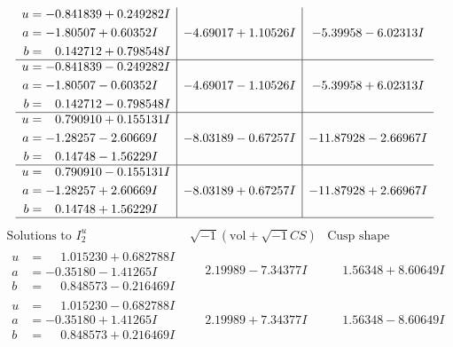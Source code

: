 \documentclass[1p]{elsarticle_modified}
\theoremstyle{definition}
\newcommand{\I}{\sqrt{-1}}
\begin{document}
$$\begin{array}{c|c|c}
\begin{aligned}
u &= -0.841839 + 0.249282 I \\
a &= -1.80507 + 0.60352 I \\
b &= \phantom{-}0.142712 + 0.798548 I\end{aligned}
 & -4.69017 + 1.10526 I & -5.39958 - 6.02313 I \\ \hline\begin{aligned}
u &= -0.841839 - 0.249282 I \\
a &= -1.80507 - 0.60352 I \\
b &= \phantom{-}0.142712 - 0.798548 I\end{aligned}
 & -4.69017 - 1.10526 I & -5.39958 + 6.02313 I \\ \hline\begin{aligned}
u &= \phantom{-}0.790910 + 0.155131 I \\
a &= -1.28257 - 2.60669 I \\
b &= \phantom{-}0.14748 - 1.56229 I\end{aligned}
 & -8.03189 - 0.67257 I & -11.87928 - 2.66967 I \\ \hline\begin{aligned}
u &= \phantom{-}0.790910 - 0.155131 I \\
a &= -1.28257 + 2.60669 I \\
b &= \phantom{-}0.14748 + 1.56229 I\end{aligned}
 & -8.03189 + 0.67257 I & -11.87928 + 2.66967 I\\
 \hline 
 \end{array}$$\newpage$$\begin{array}{c|c|c}  
\text{Solutions to }I^u_{2}& \I (\text{vol} + \sqrt{-1}CS) & \text{Cusp shape}\\
 \hline 
\begin{aligned}
u &= \phantom{-}1.015230 + 0.682788 I \\
a &= -0.35180 - 1.41265 I \\
b &= \phantom{-}0.848573 - 0.216469 I\end{aligned}
 & \phantom{-}2.19989 - 7.34377 I & \phantom{-}1.56348 + 8.60649 I \\ \hline\begin{aligned}
u &= \phantom{-}1.015230 - 0.682788 I \\
a &= -0.35180 + 1.41265 I \\
b &= \phantom{-}0.848573 + 0.216469 I\end{aligned}
 & \phantom{-}2.19989 + 7.34377 I & \phantom{-}1.56348 - 8.60649 I \\ \hline\begin{aligned}

\end{aligned}
\end{array}$$
\end{document}
